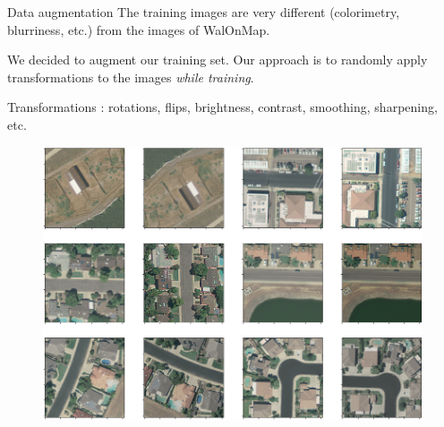\documentclass[12pt]{beamer}
\begin{document}
\begin{frame}{Data augmentation}
    The training images are very different (\alert{colorimetry}, \alert{blurriness}, etc.) from the images of \alert{WalOnMap}.
    
    We decided to \alert{augment} our training set. Our approach is to randomly apply transformations to the images \emph{while training}.
    
    Transformations : rotations, flips, brightness, contrast, smoothing, sharpening, etc.
\end{frame}

\begin{frame}
    \begin{figure}
        \centering
        \vspace{1em}
        \includegraphics[width=\textwidth]{resources/png/augmentation.png}
        \vspace{-2em}
    \end{figure}
\end{frame}
\end{document}
